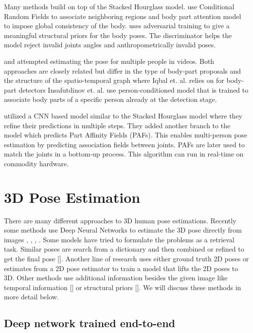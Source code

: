 Many methods build on top of the Stacked Hourglass model. \parencite{chu2017multi} use Conditional Random Fields to associate neighboring regions and body part attention model to impose global consistency of the body. \parencite{chou2017self} uses adversarial training to give a meaningful structural priors for the body poses. The discriminator helps the model reject invalid joints angles and anthropometrically invalid poses.

\parencite{iqbal2017posetrack} and \parencite{insafutdinov2017arttrack} attempted estimating the pose for multiple people in  videos. Both approaches are closely related but differ in the type of body-part proposals and the structure of the spatio-temporal graph where Iqbal et. al. relies on \parencite{insafutdinov2016deepercut} for body-part detectors Insafutdinov et. al. use person-conditioned model that is trained to associate body parts of a specific person already at the detection stage. 

\parencite{cao2016realtime} utilized a CNN based model similar to the Stacked Hourglass model where they refine their predictions in multiple steps. They added another branch to the model which predicts Part Affinity Fields (PAFs). This enables multi-person pose estimation by predicting association fields between joints. PAFs are later used to match the joints in a bottom-up process. This algorithm can run in real-time on commodity hardware.

\section{3D Pose Estimation}

There are many different approaches to 3D human pose estimations. Recently some methods use Deep Neural Networks to estimate the 3D pose directly from images \parencite{pavlakos2017coarse}, \parencite{tekin2016structured}, \parencite{varol2017learning}, \parencite{rogez2016mocap}. Some models have tried to formulate the problems as a retrieval task. Similar poses are search from a dictionary and then combined or refined to get the final pose []. Another line of research uses either ground truth 2D poses or estimates from a 2D pose estimator to train a model that lifts the 2D poses to 3D. Other methods use additional information besides the given image like temporal information [] or structural priors []. We will discuss these methods in more detail below.

\subsection{Deep network trained end-to-end}

